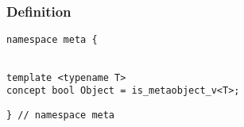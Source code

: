 
\subsubsection{Definition}

\begin{verbatim}
namespace meta {
\end{verbatim}
\begin{verbatim}

template <typename T>
concept bool Object = is_metaobject_v<T>;

\end{verbatim}
\begin{verbatim}
} // namespace meta
\end{verbatim}
